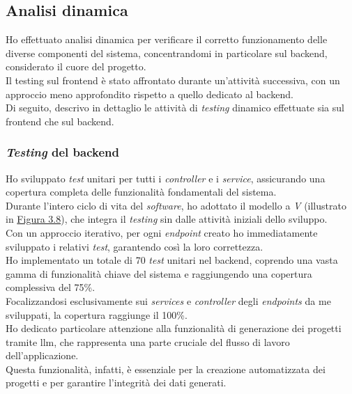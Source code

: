 \subsection{Analisi dinamica}
\label{subsec:analisi-dinamica}


Ho effettuato analisi dinamica per verificare il corretto funzionamento delle diverse componenti del sistema, concentrandomi in particolare sul \gls{backend}, considerato il cuore del progetto. \\
Il testing sul \gls{frontend} è stato affrontato durante un'attività successiva, con un approccio meno approfondito rispetto a quello dedicato al \gls{backend}.\\

\noindent Di seguito, descrivo in dettaglio le attività di \textit{testing} dinamico effettuate sia sul \gls{frontend} che sul \gls{backend}.

\subsubsection{\textit{Testing} del \gls{backend}}

Ho sviluppato \textit{test} unitari per tutti i \textit{controller} e i \textit{service}, assicurando una copertura completa delle funzionalità fondamentali del sistema.\\

\noindent Durante l'intero ciclo di vita del \textit{software}, ho adottato il modello a \textit{V} (illustrato in {\hyperref[fig:v-model]{Figura 3.8}}), che integra il \textit{testing} sin dalle attività iniziali dello sviluppo. \\
Con un approccio iterativo, per ogni \textit{endpoint} creato ho immediatamente sviluppato i relativi \textit{test}, garantendo così la loro correttezza.\\

\noindent Ho implementato un totale di 70 \textit{test} unitari nel \gls{backend}, coprendo una vasta gamma di funzionalità chiave del sistema e raggiungendo una copertura complessiva del 75\%.\\
Focalizzandosi esclusivamente sui \textit{services} e \textit{controller} degli \textit{endpoints} da me sviluppati, la copertura raggiunge il 100\%.\\
Ho dedicato particolare attenzione alla funzionalità di generazione dei progetti tramite \gls{llm}, che rappresenta una parte cruciale del flusso di lavoro dell'applicazione.\\
 Questa funzionalità, infatti, è essenziale per la creazione automatizzata dei progetti e per garantire l'integrità dei dati generati.\\

